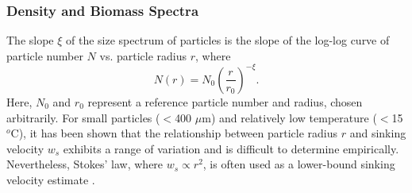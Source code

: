 \documentclass[article,linenumbers]{agujournal2018}
\begin{document}
\subsubsection{Density and Biomass Spectra}
\label{sec: equations_biomass}
The slope $\xi$ of the size spectrum of particles \citep[also know as the Junge slope;][]{White_2015} is the slope of the log-log curve of particle number $N$ vs. particle radius $r$, where
\begin{equation}
N(r) = N_0 \left(\frac{r}{r_0}\right)^{-\xi}.
\label{eq: powerlaw_radius}
\end{equation}
Here, $N_0$ and $r_0$ represent a reference particle number and radius, chosen arbitrarily. For small particles ($<$400 $\mu$m) and relatively low temperature ($<$15$^o$C), it has been shown that the relationship between particle radius $r$ and sinking velocity $w_s$ exhibits a range of variation and is difficult to determine empirically. Nevertheless, Stokes' law, where $w_s \propto r^2$, is often used as a lower-bound sinking velocity estimate \citep{Bach_2012}.
\end{document}
